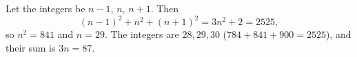 Let the integers be $n-1$, $n$, $n+1$. Then
\[
(n-1)^2+n^2+(n+1)^2=3n^2+2=2525,
\]
so $n^2=841$ and $n=29$. The integers are $28,29,30$ ($784+841+900=2525$), and their sum is $3n=\boxed{87}$.
